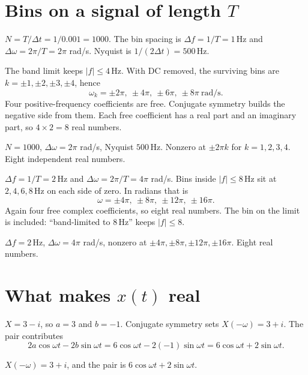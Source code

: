 \documentclass[11pt,letterpaper]{article}
\newcommand{\ans}[1]{\par\vspace{2pt}{\bfseries #1}\quad}
\begin{document}
\section{Bins on a signal of length $T$}

\ans{1.}
$N = T/\Delta t = 1/0.001 = 1000$. The bin spacing is $\Delta f = 1/T = 1\,\mathrm{Hz}$ and $\Delta\omega = 2\pi/T = 2\pi$ rad/s. Nyquist is $1/(2\Delta t) = 500\,\mathrm{Hz}$.

The band limit keeps $|f| \le 4\,\mathrm{Hz}$. With DC removed, the surviving bins are $k = \pm 1,\pm 2,\pm 3,\pm 4$, hence
\[
\omega_k = \pm 2\pi,\ \pm 4\pi,\ \pm 6\pi,\ \pm 8\pi\ \mathrm{rad/s}.
\]
Four positive-frequency coefficients are free. Conjugate symmetry builds the negative side from them. Each free coefficient has a real part and an imaginary part, so $4 \times 2 = 8$ real numbers.
\begin{result}
$N = 1000$, $\Delta\omega = 2\pi$ rad/s, Nyquist $500\,\mathrm{Hz}$. Nonzero at $\pm 2\pi k$ for $k = 1,2,3,4$. Eight independent real numbers.
\end{result}

\ans{2.}
$\Delta f = 1/T = 2\,\mathrm{Hz}$ and $\Delta\omega = 2\pi/T = 4\pi$ rad/s. Bins inside $|f| \le 8\,\mathrm{Hz}$ sit at $2,4,6,8\,\mathrm{Hz}$ on each side of zero. In radians that is
\[
\omega = \pm 4\pi,\ \pm 8\pi,\ \pm 12\pi,\ \pm 16\pi.
\]
Again four free complex coefficients, so eight real numbers. The bin on the limit is included: ``band-limited to $8\,\mathrm{Hz}$'' keeps $|f| \le 8$.
\begin{result}
$\Delta f = 2\,\mathrm{Hz}$, $\Delta\omega = 4\pi$ rad/s, nonzero at $\pm 4\pi,\pm 8\pi,\pm 12\pi,\pm 16\pi$. Eight real numbers.
\end{result}

\section{What makes $x(t)$ real}

\ans{1.}
$X = 3 - i$, so $a = 3$ and $b = -1$. Conjugate symmetry sets $X(-\omega) = 3 + i$. The pair contributes
\[
2a\cos\omega t - 2b\sin\omega t = 6\cos\omega t - 2(-1)\sin\omega t = 6\cos\omega t + 2\sin\omega t.
\]
\begin{result}
$X(-\omega) = 3+i$, and the pair is $6\cos\omega t + 2\sin\omega t$.
\end{result}
\end{document}
